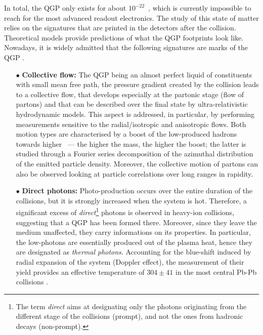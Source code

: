In total, the QGP only exists for about $10^{-22}$~\second, which is currently impossible to reach for the most advanced readout electronics. The study of this state of matter relies on the signatures that are printed in the detectors after the collision. Theoretical models provide predictions of what the QGP footprints look like. Nowadays, it is widely admitted that the following signatures are marks of the QGP \cite{alicecollaborationALICEExperimentJourney2022}.

\begin{itemize}
\item[$\bullet$] \textbf{Collective flow:} The QGP being an almost perfect liquid of constituents with small mean free path, the pressure gradient created by the collision leads to a collective flow, that develops especially at the partonic stage (flow of partons) and that can be described over the final state by ultra-relativistic hydrodynamic models.  This aspect is addressed, in particular, by performing measurements sensitive to the radial/isotropic and anisotropic flows. Both motion types are characterised by a boost of the low-\pT produced hadrons towards higher \pT\ --- the higher the mass, the higher the boost; the latter is studied through a Fourier series decomposition of the azimuthal distribution of the emitted particle density. Moreover, the collective motion of partons can also be observed looking at particle correlations over long ranges in rapidity.\\

\item[$\bullet$] \textbf{Direct photons:} Photo-production occurs over the entire duration of the collisions, but it is strongly increased when the system is hot. Therefore, a significant excess of \textit{direct}\footnote{The term \textit{direct} aims at designating only the photons originating from the different stage of the collisions (prompt), and not the ones from hadronic decays (non-prompt).} photons is observed in heavy-ion collisions, suggesting that a QGP has been formed there. Moreover, since they leave the medium unaffected, they carry informations on its properties. In particular, the low-\pT photons are essentially produced out of the plasma heat, hence they are designated as \textit{thermal photons}. Accounting for the blue-shift induced by radial expansion of the system (Doppler effect), the measurement of their yield provides an effective temperature of $304 \pm 41$ \mev in the most central Pb-Pb collisions \cite{alicecollaborationALICEExperimentJourney2022}.\\


\end{itemize}
